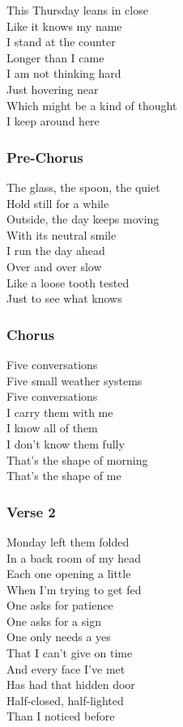 This Thursday leans in close\\
Like it knows my name\\
I stand at the counter\\
Longer than I came\\
I am not thinking hard\\
Just hovering near\\
Which might be a kind of thought\\
I keep around here

\subsubsection{Pre-Chorus}\label{pre-chorus-2}

The glass, the spoon, the quiet\\
Hold still for a while\\
Outside, the day keeps moving\\
With its neutral smile\\
I run the day ahead\\
Over and over slow\\
Like a loose tooth tested\\
Just to see what knows

\subsubsection{Chorus}\label{chorus-10}

Five conversations\\
Five small weather systems\\
Five conversations\\
I carry them with me\\
I know all of them\\
I don't know them fully\\
That's the shape of morning\\
That's the shape of me

\subsubsection{Verse 2}\label{verse-2-2}

Monday left them folded\\
In a back room of my head\\
Each one opening a little\\
When I'm trying to get fed\\
One asks for patience\\
One asks for a sign\\
One only needs a yes\\
That I can't give on time\\
And every face I've met\\
Has had that hidden door\\
Half-closed, half-lighted\\
Than I noticed before

